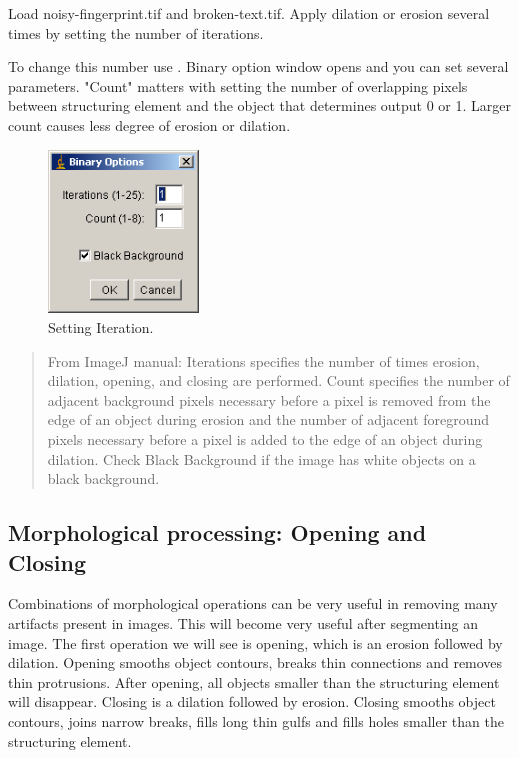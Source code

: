 \begin{indentexercise}{1}
Load noisy-fingerprint.tif and broken-text.tif. Apply dilation or
erosion several times by setting the number of iterations. 

To change this number use . 
Binary option window opens and you can set
several parameters. "Count"
matters with setting the number of overlapping pixels between
structuring element and the object that determines output 0 or 1.
Larger count causes less degree of erosion or dilation.

\begin{figure}[htbp]
\begin{center}
\includegraphics[width=4cm]{fig/CMCIBasicCourse201102-img67.png}
\caption{ Setting Iteration.}
\label{fig:img67}
\end{center}
\end{figure}
\end{indentexercise}

\begin{quote}
From ImageJ manual: Iterations specifies the number of times erosion,
dilation, opening, and closing are performed. Count specifies the
number of adjacent background pixels necessary before a pixel is
removed from the edge of an object during erosion and the number of
adjacent foreground pixels necessary before a pixel is added to the
edge of an object during dilation. Check Black Background if the image
has white objects on a black background.
\end{quote}

\subsection{Morphological processing: Opening and Closing}

Combinations of morphological operations can be very useful in removing
many artifacts present in images. This will become very useful after
segmenting an image. The first operation we will see is opening, which
is an erosion followed by dilation. Opening smooths object contours,
breaks thin connections and removes thin protrusions. After opening,
all objects smaller than the structuring element will disappear.
Closing is a dilation followed by erosion. Closing smooths object
contours, joins narrow breaks, fills long thin gulfs and fills holes
smaller than the structuring element.

